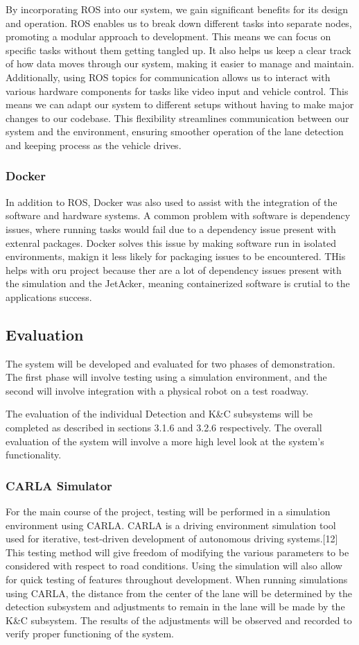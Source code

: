 \documentclass[titlepage]{article}
\begin{document}
{By incorporating ROS into our system, we gain significant benefits for its design and operation. ROS enables us to break down different tasks into separate nodes, promoting a modular approach to development. This means we can focus on specific tasks without them getting tangled up. It also helps us keep a clear track of how data moves through our system, making it easier to manage and maintain. Additionally, using ROS topics for communication allows us to interact with various hardware components for tasks like video input and vehicle control. This means we can adapt our system to different setups without having to make major changes to our codebase. This flexibility streamlines communication between our system and the environment, ensuring smoother operation of the lane detection and keeping process as the vehicle drives.


\subsubsection{Docker}
In addition to ROS, Docker was also used to assist with the integration of the software and hardware systems. A common problem with software is dependency issues, where running tasks would fail due to a dependency issue present with extenral packages. Docker solves this issue by making software run in isolated environments, makign it less likely for packaging issues to be encountered. THis helps with oru project because ther are a lot of dependency issues present with the simulation and the JetAcker, meaning containerized software is crutial to the applications success.


\subsection{Evaluation}
The system will be developed and evaluated for two phases of demonstration. The first phase will involve testing using a simulation environment, and the second will involve integration with a physical robot on a test roadway.

The evaluation of the individual Detection and K\&C subsystems will be completed as described in sections 3.1.6 and 3.2.6 respectively. The overall evaluation of the system will involve a more high level look at the system’s functionality.

\subsubsection{CARLA Simulator}
For the main course of the project, testing will be performed in a simulation environment using CARLA. CARLA is a driving environment simulation tool used for iterative, test-driven development of autonomous driving systems.[12] This testing method will give freedom of modifying the various parameters to be considered with respect to road conditions. Using the simulation will also allow for quick testing of features throughout development. When running simulations using CARLA, the distance from the center of the lane will be determined by the detection subsystem and adjustments to remain in the lane will be made by the K\&C subsystem. The results of the adjustments will be observed and recorded to verify proper functioning of the system.

}
\end{document}
